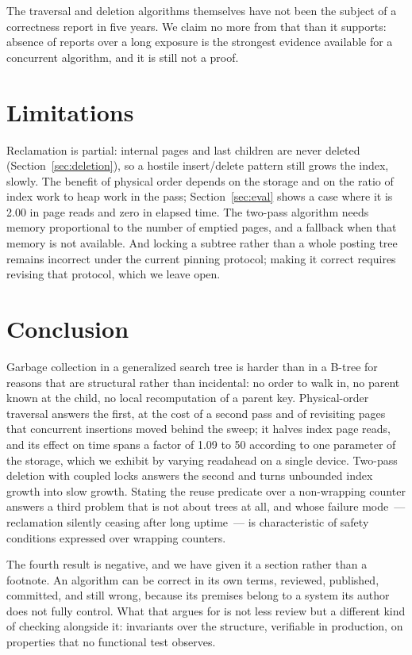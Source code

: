 The traversal and deletion algorithms themselves have not been the subject of a
correctness report in five years. We claim no more from that than it supports:
absence of reports over a long exposure is the strongest evidence available for
a concurrent algorithm, and it is still not a proof.

\section{Limitations}

Reclamation is partial: internal pages and last children are never deleted
(Section~\ref{sec:deletion}), so a hostile insert/delete pattern still grows the
index, slowly. The benefit of physical order depends on the storage and on the
ratio of index work to heap work in the pass; Section~\ref{sec:eval} shows a
case where it is 2.00 in page reads and zero in elapsed time. The two-pass
algorithm needs memory proportional to the number of emptied pages, and a
fallback when that memory is not available. And locking a subtree rather than a
whole posting tree remains incorrect under the current pinning protocol; making
it correct requires revising that protocol, which we leave open.

\section{Conclusion}

Garbage collection in a generalized search tree is harder than in a B-tree for
reasons that are structural rather than incidental: no order to walk in, no
parent known at the child, no local recomputation of a parent key. Physical-order
traversal answers the first, at the cost of a second pass and of revisiting pages
that concurrent insertions moved behind the sweep; it halves index page reads,
and its effect on time spans a factor of 1.09 to 50 according to one parameter
of the storage, which we exhibit by varying readahead on a single device. Two-pass deletion with coupled locks answers the second and
turns unbounded index growth into slow growth. Stating the reuse predicate over a
non-wrapping counter answers a third problem that is not about trees at all, and
whose failure mode~--- reclamation silently ceasing after long uptime~--- is
characteristic of safety conditions expressed over wrapping counters.

The fourth result is negative, and we have given it a section rather than a
footnote. An algorithm can be correct in its own terms, reviewed, published,
committed, and still wrong, because its premises belong to a system its author
does not fully control. What that argues for is not less review but a different
kind of checking alongside it: invariants over the structure, verifiable in
production, on properties that no functional test observes.
